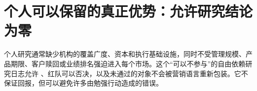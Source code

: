 \section{个人可以保留的真正优势：允许研究结论为零}

个人研究通常缺少机构的覆盖广度、资本和执行基础设施，同时不受管理规模、产品期限、客户赎回或业绩排名强迫进入每个市场。这个“可以不参与”的自由依赖研究日志允许 \qzero{}、红队可以否决，以及未通过的对象不会被营销语言重新包装。它不保证回报，但可以避免许多由勉强行动造成的错误。
